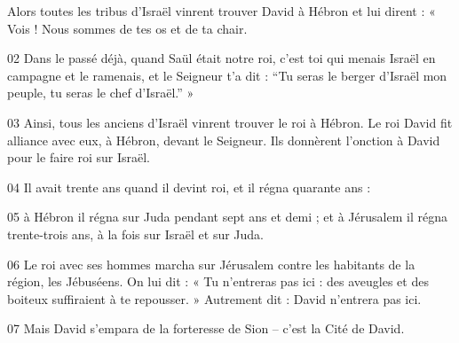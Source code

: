 Alors toutes les tribus d’Israël vinrent trouver David à Hébron et lui dirent : « Vois ! Nous sommes de tes os et de ta chair.

02 Dans le passé déjà, quand Saül était notre roi, c’est toi qui menais Israël en campagne et le ramenais, et le Seigneur t’a dit : “Tu seras le berger d’Israël mon peuple, tu seras le chef d’Israël.” »

03 Ainsi, tous les anciens d’Israël vinrent trouver le roi à Hébron. Le roi David fit alliance avec eux, à Hébron, devant le Seigneur. Ils donnèrent l’onction à David pour le faire roi sur Israël.

04 Il avait trente ans quand il devint roi, et il régna quarante ans :

05 à Hébron il régna sur Juda pendant sept ans et demi ; et à Jérusalem il régna trente-trois ans, à la fois sur Israël et sur Juda.

06 Le roi avec ses hommes marcha sur Jérusalem contre les habitants de la région, les Jébuséens. On lui dit : « Tu n’entreras pas ici : des aveugles et des boiteux suffiraient à te repousser. » Autrement dit : David n’entrera pas ici.

07 Mais David s’empara de la forteresse de Sion – c’est la Cité de David.